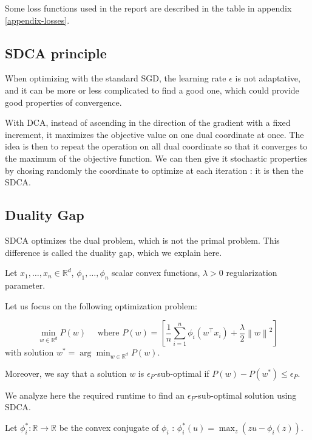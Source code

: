 \documentclass{article}
\newcommand{\norm}[1]{\left\|#1 \right\|}
\begin{document}
Some loss functions used in the report are described in the table in appendix \ref{appendix-losses}.

\subsection{SDCA principle}

\hspace{2em}
When optimizing with the standard SGD, the learning rate $\epsilon$ is not adaptative, and it can be more or less complicated to find a good one, which could provide good properties of convergence.

\hspace{2em}
With DCA, instead of ascending in the direction of the gradient with a fixed increment, it maximizes the objective value on one dual coordinate at once.
The idea is then to repeat the operation on all dual coordinate so that it converges to the maximum of the objective function.
We can then give it stochastic properties by chosing randomly the coordinate to optimize at each iteration : it is then the SDCA.

\subsection{Duality Gap}

SDCA optimizes the dual problem, which is not the primal problem.
This difference is called the duality gap, which we explain here.

Let $x_1, \dots, x_n \in \mathbb{R}^d$, $\phi_1, \dots, \phi_n$ scalar convex functions, $\lambda > 0$ regularization parameter.

Let us focus on the following optimization problem:

\begin{equation}
	\min_{w \in \mathbb{R}^d} P(w) \quad \text{ where } P(w) = \left[ \dfrac{1}{n} \sum_{i=1}^n \phi_i(w^\top x_i) + \dfrac{\lambda}{2}\norm{w}^2 \right]
	\label{primal}
\end{equation}
with solution $w^{*} = \arg \min_{w \in \mathbb{R}^d} P(w)$.

Moreover, we say that a solution $w$ is $\epsilon_P$-sub-optimal if $P(w) - P(w^{*}) \leq \epsilon_P$.

We analyze here the required runtime to find an $\epsilon_P$-sub-optimal solution using SDCA.

Let $\phi_i^{*} : \mathbb{R} \rightarrow \mathbb{R}$ be the convex conjugate of $\phi_i$ : $\phi_i^{*}(u) = \max_z (zu-\phi_i(z))$.
\end{document}
